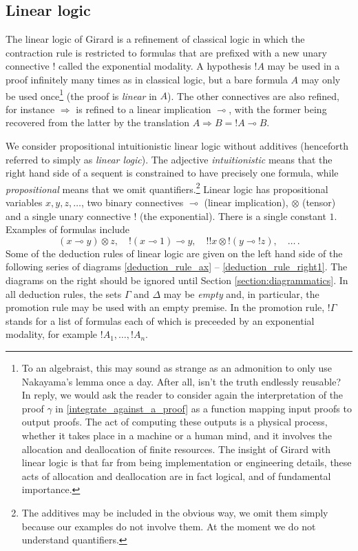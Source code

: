 \documentclass[english,letter paper,12pt,reqno]{article}
\theoremstyle{example}
\numberwithin{equation}{section}
\begin{document}
\subsection{Linear logic}\label{section:intro_ll}

The linear logic of Girard \cite{girard_llogic, mellies} is a refinement of classical logic in which the contraction rule is restricted to formulas that are prefixed with a new unary connective ${!}$ called the exponential modality. A hypothesis ${!} A$ may be used in a proof infinitely many times as in classical logic, but a bare formula $A$ may only be used once\footnote{To an algebraist, this may sound as strange as an admonition to only use Nakayama's lemma once a day. After all, isn't the truth endlessly reusable? In reply, we would ask the reader to consider again the interpretation of the proof $\gamma$ in \eqref{integrate_against_a_proof} as a function mapping input proofs to output proofs. The act of computing these outputs is a physical process, whether it takes place in a machine or a human mind, and it involves the allocation and deallocation of finite resources. The insight of Girard with linear logic is that far from being implementation or engineering details, these acts of allocation and deallocation are in fact logical, and of fundamental importance.} (the proof is \emph{linear} in $A$). The other connectives are also refined, for instance $\Rightarrow$ is refined to a linear implication $\multimap$, with the former being recovered from the latter by the translation $A \Rightarrow B = {!} A \multimap B$.

We consider propositional intuitionistic linear logic without additives (henceforth referred to simply as \emph{linear logic}). The adjective \emph{intuitionistic} means that the right hand side of a sequent is constrained to have precisely one formula, while \emph{propositional} means that we omit quantifiers.\footnote{The additives may be included in the obvious way, we omit them simply because our examples do not involve them. At the moment we do not understand quantifiers.} Linear logic has propositional variables $x,y,z,\ldots$, two binary connectives $\multimap$ (linear implication), $\otimes$ (tensor) and a single unary connective $!$ (the exponential). There is a single constant $1$. Examples of formulas include
\[
(x \multimap y) \otimes z, \quad {!}( x \multimap 1 ) \multimap y, \quad {!}{!}x \otimes {!}( y \multimap {!}z ), \quad \ldots\,.
\]
Some of the deduction rules of linear logic are given on the left hand side of the following series of diagrams \eqref{deduction_rule_ax} -- \eqref{deduction_rule_right1}. The diagrams on the right should be ignored until Section \ref{section:diagrammatics}. In all deduction rules, the sets $\Gamma$ and $\Delta$ may be \emph{empty} and, in particular, the promotion rule may be used with an empty premise. In the promotion rule, ${!} \Gamma$ stands for a list of formulas each of which is preceeded by an exponential modality, for example ${!}A_1,\ldots, {!}A_n$.
\end{document}
